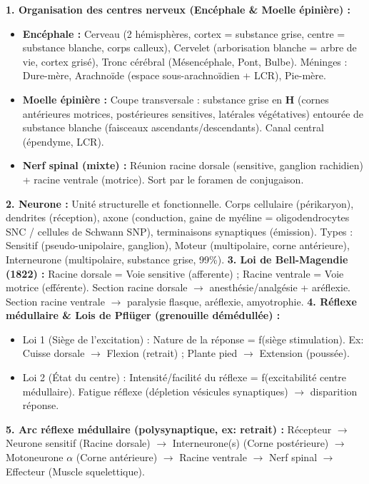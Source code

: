 \documentclass[11pt]{article}
\newcommand{\cle}[1]{{\popxbold\color{popdark}#1}}
\begin{document}
\begin{aretenir}
\textbf{1. Organisation des centres nerveux (Encéphale \& Moelle épinière) :}
\begin{itemize}
    \item \textbf{Encéphale :} Cerveau (2 hémisphères, cortex = substance grise, centre = substance blanche, corps calleux), Cervelet (arborisation blanche = arbre de vie, cortex grisé), Tronc cérébral (Mésencéphale, Pont, Bulbe). Méninges : Dure-mère, Arachnoïde (espace sous-arachnoïdien + LCR), Pie-mère.
    \item \textbf{Moelle épinière :} Coupe transversale : substance grise en \textbf{H} (cornes antérieures motrices, postérieures sensitives, latérales végétatives) entourée de substance blanche (faisceaux ascendants/descendants). Canal central (épendyme, LCR).
    \item \textbf{Nerf spinal (mixte) :} Réunion racine dorsale (sensitive, ganglion rachidien) + racine ventrale (motrice). Sort par le foramen de conjugaison.
\end{itemize}
\textbf{2. Neurone :} Unité structurelle et fonctionnelle. Corps cellulaire (périkaryon), dendrites (réception), axone (conduction, gaine de myéline = oligodendrocytes SNC / cellules de Schwann SNP), terminaisons synaptiques (émission). Types : Sensitif (pseudo-unipolaire, ganglion), Moteur (multipolaire, corne antérieure), Interneurone (multipolaire, substance grise, 99\%).
\textbf{3. Loi de Bell-Magendie (1822) :} \cle{Racine dorsale = Voie sensitive (afferente)} ; \cle{Racine ventrale = Voie motrice (efférente)}. Section racine dorsale $\rightarrow$ anesthésie/analgésie + aréflexie. Section racine ventrale $\rightarrow$ paralysie flasque, aréflexie, amyotrophie.
\textbf{4. Réflexe médullaire \& Lois de Pflüger (grenouille démédullée) :}
\begin{itemize}
    \item \cle{Loi 1 (Siège de l'excitation) :} Nature de la réponse = f(siège stimulation). Ex: Cuisse dorsale $\rightarrow$ Flexion (retrait) ; Plante pied $\rightarrow$ Extension (poussée).
    \item \cle{Loi 2 (État du centre) :} Intensité/facilité du réflexe = f(excitabilité centre médullaire). Fatigue réflexe (dépletion vésicules synaptiques) $\rightarrow$ disparition réponse.
\end{itemize}
\textbf{5. Arc réflexe médullaire (polysynaptique, ex: retrait) :} Récepteur $\rightarrow$ Neurone sensitif (Racine dorsale) $\rightarrow$ Interneurone(s) (Corne postérieure) $\rightarrow$ Motoneurone $\alpha$ (Corne antérieure) $\rightarrow$ Racine ventrale $\rightarrow$ Nerf spinal $\rightarrow$ Effecteur (Muscle squelettique).

\end{aretenir}
\end{document}
